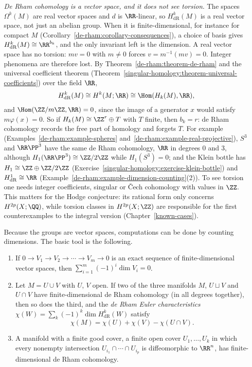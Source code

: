 \begin{remark}\label{de-rham:remark-no-torsion}
\emph{De Rham cohomology is a vector space, and it does not see torsion.} The spaces $\Omega^k(M)$ are real vector spaces and $d$ is $\RR$-linear, so $H^k_{\mathrm{dR}}(M)$ is a real vector space, not just an abelian group.
When it is finite-dimensional, for instance for compact $M$ (Corollary~\ref{de-rham:corollary-consequences}), a choice of basis gives $H^k_{\mathrm{dR}}(M) \cong \RR^{b_k}$, and the only invariant left is the dimension.
A real vector space has no torsion: $mv = 0$ with $m \neq 0$ forces $v = m^{-1}(mv) = 0$. Integer phenomena are therefore lost. By Theorem~\ref{de-rham:theorem-de-rham} and the universal coefficient theorem
(Theorem~\ref{singular-homology:theorem-universal-coefficients}) over the field $\RR$,
\[
H^k_{\mathrm{dR}}(M) \cong H^k(M; \RR) \cong \Hom(H_k(M), \RR),
\]
and $\Hom(\ZZ/m\ZZ, \RR) = 0$, since the image of a generator $x$ would satisfy $m\varphi(x) = 0$. So if $H_k(M) \cong \ZZ^{r} \oplus T$ with $T$ finite, then $b_k = r$: de Rham cohomology records the free part of homology and
forgets $T$. For example (Examples~\ref{de-rham:example-spheres} and~\ref{de-rham:example-real-projective}), $S^3$ and $\RR\PP^3$ have the same de Rham cohomology, $\RR$ in degrees $0$ and $3$, although
$H_1(\RR\PP^3) \cong \ZZ/2\ZZ$ while $H_1(S^3) = 0$; and the Klein bottle has $H_1 \cong \ZZ \oplus \ZZ/2\ZZ$ (Exercise~\ref{singular-homology:exercise-klein-bottle}) and $H^1_{\mathrm{dR}} \cong \RR$
(Example~\ref{de-rham:example-dimension-counting}(2)). To see torsion one needs integer coefficients, singular or \v{C}ech cohomology with values in $\ZZ$. This matters for the Hodge conjecture: its rational form only
concerns $H^{2p}(X; \QQ)$, while torsion classes in $H^{2p}(X; \ZZ)$ are responsible for the first counterexamples to the integral version (Chapter~\ref{known-cases}).
\end{remark}

Because the groups are vector spaces, computations can be done by counting dimensions. The basic tool is the following.

\begin{proposition}\label{de-rham:proposition-dimension-counting}
\begin{enumerate}
\item If $0 \to V_1 \to V_2 \to \cdots \to V_m \to 0$ is an exact sequence of finite-dimensional vector spaces, then $\sum_{i=1}^m(-1)^i\dim V_i = 0$.
\item Let $M = U \cup V$ with $U$, $V$ open. If two of the three manifolds $M$, $U \sqcup V$ and $U \cap V$ have finite-dimensional de Rham cohomology (in all degrees together), then so does the third, and the
\emph{de Rham Euler characteristics} $\chi(W) = \sum_k(-1)^k\dim H^k_{\mathrm{dR}}(W)$ satisfy
\[
\chi(M) = \chi(U) + \chi(V) - \chi(U \cap V).
\]
\item A manifold with a finite good cover, a finite open cover $U_1, \ldots, U_k$ in which every nonempty intersection $U_{i_1} \cap \cdots \cap U_{i_p}$ is diffeomorphic to $\RR^n$, has finite-dimensional de Rham
cohomology.
\end{enumerate}
\end{proposition}

